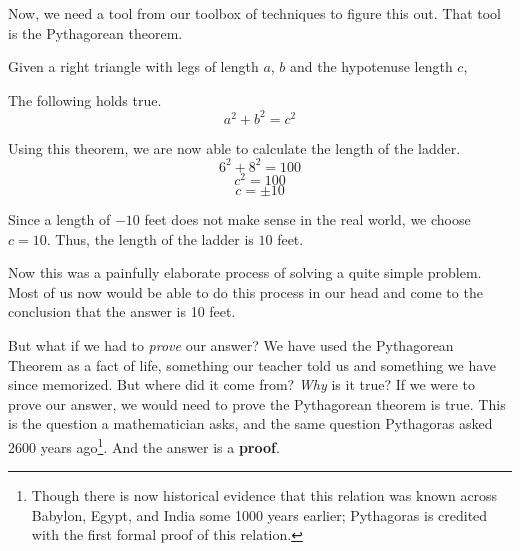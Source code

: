 Now, we need a tool from our toolbox of techniques to figure this out. That tool is the Pythagorean theorem. 
\begin{theorem} 
Given a right triangle with legs of length $a$, $b$ and the hypotenuse length $c$, 
\begin{center}
\end{center}
The following holds true.
\[
a^2 + b^2 = c^2
\]
\end{theorem}

Using this theorem, we are now able to calculate the length of the ladder. 
\[6^2 + 8^2 = 100 \]
\[c^2 = 100 \]
\[ c = \pm 10\]

Since a length of $-10$ feet does not make sense in the real world, we choose $c = 10$. Thus, the length of the ladder is $10$ feet.

Now this was a painfully elaborate process of solving a quite simple problem. Most of us now would be able to do this process in our head and come to the conclusion that the answer is 10 feet. 

But what if we had to \emph{prove} our answer? We have used the Pythagorean Theorem as a fact of life, something our teacher told us and something we have since memorized. But where did it come from? \emph{Why} is it true? If we were to prove our answer, we would need to prove the Pythagorean theorem is true. This is the question a mathematician asks, and the same question Pythagoras asked 2600 years ago\footnote{Though there is now historical evidence that this relation was known across Babylon, Egypt, and India some 1000 years earlier; Pythagoras is credited with the first formal proof of this relation.}. And the answer is a \textbf{proof}.

